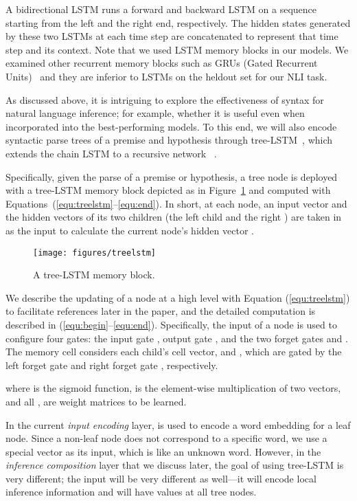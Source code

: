 \documentclass[11pt,a4paper]{article}
\begin{document}
A bidirectional LSTM runs a forward and backward LSTM on a sequence starting from the left and the right end, respectively. The hidden states generated by these two LSTMs at each time step are concatenated to represent that time step and its context. Note that we used LSTM memory blocks in our models. We examined other recurrent memory blocks such as GRUs (Gated Recurrent Units)~\citep{DBLP:conf/ssst/ChoMBB14} and they are inferior to LSTMs on the heldout set for our NLI task. 

As discussed above, it is intriguing to explore the effectiveness of syntax for natural language inference; for example, whether it is useful even when incorporated into the best-performing models. To this end, we will also encode syntactic parse trees of a premise and hypothesis through tree-LSTM~\citep{DBLP:conf/icml/ZhuSG15,Tai:P15-1150,Le:S15-1002}, which extends the chain LSTM to a recursive network ~\citep{DBLP:conf/icml/SocherLNM11}.

Specifically, given the parse of a premise or hypothesis, a tree node is deployed with a tree-LSTM memory block depicted as in Figure~\ref{fig:tree-lstm} and computed with Equations~(\ref{equ:treelstm}--\ref{equ:end}). In short, at each node, an input vector  and the hidden vectors of its two children (the left child  and the right ) are taken in as the input to calculate the current node's hidden vector . 

\begin{figure}[!htb]
	\centering
	\texttt{[image: figures/treelstm]}
	\caption{A tree-LSTM memory block.}
    \label{fig:tree-lstm} 
\end{figure}

We describe the updating of a node at a high level with Equation (\ref{equ:treelstm}) to facilitate references later in the paper, and the detailed computation is described in (\ref{equ:begin}--\ref{equ:end}). Specifically, the input of a node is used to configure four gates: the input gate , output gate , and the two forget gates  and . The memory cell  considers each child's cell vector,  and , which are gated by the left forget gate  and right forget gate , respectively. 
{\fontsize{10pt}{1.0cm}
	
}

\noindent where  is the sigmoid function,  is the element-wise multiplication of two vectors, and all ,  are weight matrices to be learned. 

In the current \textit{input encoding} layer,  is used to encode a word embedding for a leaf node. Since a non-leaf node does not correspond to a specific word, we use a special vector  as its input, which is like an unknown word. However, in the \textit{inference composition} layer that we discuss later, the goal of using tree-LSTM is very different; the input  will be very different as well---it will encode local inference information and will have values at all tree nodes. 
\end{document}
